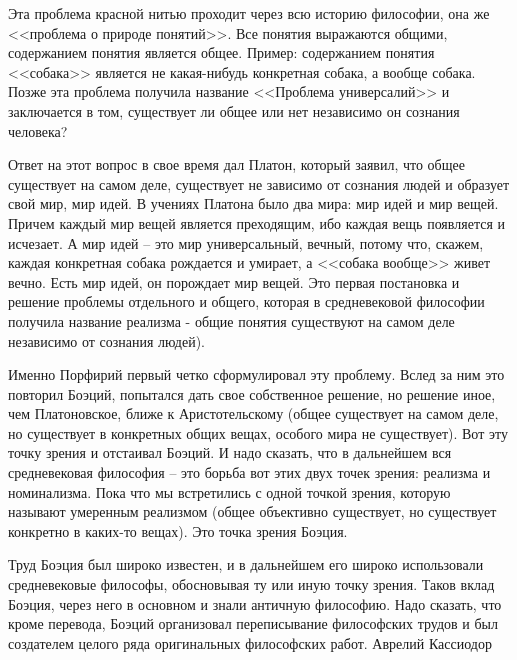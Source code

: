 Эта проблема красной нитью проходит через всю историю философии, она же <<проблема о природе понятий>>. Все понятия выражаются общими, содержанием понятия является общее. Пример: содержанием понятия <<собака>> является не какая-нибудь конкретная собака, а вообще собака. Позже эта проблема получила название <<Проблема универсалий>> и заключается в том, существует ли общее или нет независимо он сознания человека?

    Ответ на этот вопрос в свое время дал Платон, который заявил, что общее существует на самом деле, существует не зависимо от сознания людей и образует свой мир, мир идей. В учениях Платона было два мира: мир идей и мир вещей. Причем каждый мир вещей является преходящим, ибо каждая вещь появляется и исчезает. А мир идей – это мир универсальный, вечный, потому что, скажем, каждая конкретная собака рождается и умирает, а <<собака вообще>> живет вечно. Есть мир идей, он порождает мир вещей. Это первая постановка и решение проблемы отдельного и общего, которая в средневековой философии получила название реализма - общие понятия существуют на самом деле независимо от сознания людей).

Именно Порфирий первый четко сформулировал эту проблему. Вслед за ним это повторил Боэций, попытался дать свое собственное решение, но решение иное, чем Платоновское, ближе к Аристотельскому (общее существует на самом деле, но существует в конкретных общих вещах, особого мира не существует). Вот эту точку зрения и отстаивал Боэций. И надо сказать, что в дальнейшем вся средневековая философия – это борьба вот этих двух точек зрения: реализма и номинализма. Пока что мы встретились с одной точкой зрения, которую называют умеренным реализмом (общее объективно существует, но существует конкретно в каких-то вещах). Это точка зрения Боэция.

Труд Боэция был широко известен, и в дальнейшем его широко использовали средневековые философы, обосновывая ту или иную точку зрения. Таков вклад Боэция, через него в основном и знали античную философию. Надо сказать, что кроме перевода, Боэций организовал переписывание философских трудов и был создателем целого ряда оригинальных философских работ.
Аврелий Кассиодор

